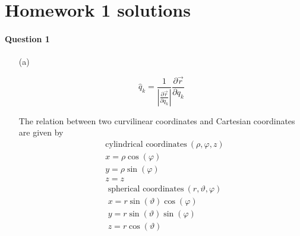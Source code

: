 \documentclass[11pt,a4paper]{article}
\author{Zehao Gao}
\begin{document}
\section{Homework 1 solutions}

\paragraph{Question 1}

\begin{enumerate}
\item[(a)]

\begin{equation}
\hat{q}_k=\frac{1}{|\frac{\partial\vec{r}}{\partial q_k}|}\frac{\partial\vec{r}}{\partial q_k}
\end{equation}

The relation between two curvilinear coordinates and Cartesian coordinates are given by
\begin{align*}
&\textrm{cylindrical coordinates}\ (\rho,\varphi,z)\\
&x=\rho\cos(\varphi)\\
&y=\rho\sin(\varphi)\\
&z=z
\end{align*}
\begin{align*}
&\textrm{spherical coordinates}\ (r,\vartheta,\varphi)\\
&x=r\sin(\vartheta)\cos(\varphi)\\
&y=r\sin(\vartheta)\sin(\varphi)\\
&z=r\cos(\vartheta)
\end{align*}


\end{enumerate}
\end{document}
